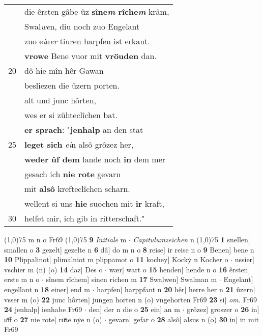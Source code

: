 \documentclass[8pt,a4paper,notitlepage]{article}
\begin{document}
\begin{table}[ht]
\begin{minipage}[t]{0.5\linewidth}
\begin{tabular}{rl}
 & die êrsten gâbe ûz \textbf{sîne\textit{m} rîche\textit{m}} krâm,\\ 
 & Swal\textit{we}n, diu noch zuo Engelant\\ 
 & zuo e\textit{i}n\textit{er} tiuren harpfen ist erkant.\\ 
 & \textbf{vrowe} Bene vuor mit \textbf{vröuden} dan.\\ 
20 & dô hie mîn hêr Gawan\\ 
 & besliezen die ûzern porten.\\ 
 & alt und junc hôrten,\\ 
 & wes er si zühteclîchen bat.\\ 
 & \textbf{er sprach}: "\textbf{jenhalp} an den stat\\ 
25 & \textbf{leget sich} \textit{ei}n alsô grôzez her,\\ 
 & \textbf{weder} \textbf{ûf dem} lande noch \textbf{in} dem mer\\ 
 & gesach ich \textbf{nie rote} gevarn\\ 
 & mit \textbf{alsô} krefteclîchen scharn.\\ 
 & wellent si uns \textbf{hie} suochen mit \textbf{ir} kraft,\\ 
30 & helfet mir, ich gib in ritterschaft."\\ 
\end{tabular}
\scriptsize
\line(1,0){75} \newline
m n o Fr69 \newline
\line(1,0){75} \newline
\textbf{9} \textit{Initiale} m   $\cdot$ \textit{Capitulumzeichen} n  \newline
\line(1,0){75} \newline
\textbf{1} snellen] smallen o \textbf{3} gezelt] gezelte n \textbf{6} dâ] do m n o \textbf{8} reise] ir reise n o \textbf{9} Benen] bene n \textbf{10} Plippalinot] plimalniot m plippamot o \textbf{11} kochey] Kockẏ n Kocher o  $\cdot$ ussier] vschier m (n) (o) \textbf{14} daz] Des o  $\cdot$ wær] wart o \textbf{15} henden] hende n o \textbf{16} êrsten] erste m n o  $\cdot$ sînem rîchem] sinen richen m \textbf{17} Swalwen] Swalman m  $\cdot$ Engelant] engellant n \textbf{18} einer] end m  $\cdot$ harpfen] harppfant n \textbf{20} hêr] herre her n \textbf{21} ûzern] vsser m (o) \textbf{22} junc hôrten] jungen horten n (o) vngehorten Fr69 \textbf{23} si] \textit{om.} Fr69 \textbf{24} jenhalp] ienhabe Fr69  $\cdot$ den] der n die o \textbf{25} ein] an m  $\cdot$ grôzez] groszer o \textbf{26} in] uͯff o \textbf{27} nie rote] roͯte nẏe n (o)  $\cdot$ gevarn] gefar o \textbf{28} alsô] alsus n (o) \textbf{30} in] in mit Fr69 \newline
\end{minipage}
\end{table}
\end{document}
